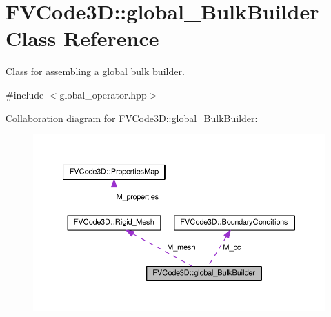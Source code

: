 \hypertarget{classFVCode3D_1_1global__BulkBuilder}{}\section{F\+V\+Code3D\+:\+:global\+\_\+\+Bulk\+Builder Class Reference}
\label{classFVCode3D_1_1global__BulkBuilder}


Class for assembling a global bulk builder.  




{\ttfamily \#include $<$global\+\_\+operator.\+hpp$>$}



Collaboration diagram for F\+V\+Code3D\+:\+:global\+\_\+\+Bulk\+Builder\+:
\nopagebreak
\begin{figure}[H]
\begin{center}
\leavevmode
\includegraphics[width=350pt]{classFVCode3D_1_1global__BulkBuilder__coll__graph}
\end{center}
\end{figure}
